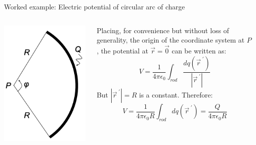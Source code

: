 {\begin{frame}{Worked example: Electric potential of circular arc of charge}
\begin{columns}
  \begin{column}{0.25\textwidth}
   \begin{center}
     \includegraphics[width=0.99\textwidth]{./images/problems/lect03_potential_arc}
   \end{center}
  \end{column}
  \begin{column}{0.70\textwidth}
    Placing, for convenience but without loss of generality, the origin of the
    coordinate system at $P$, the potential at $\vec{r}=\vec{0}$ can be written as:
    \begin{equation*}
       V = \frac{1}{4\pi\epsilon_0}
         \int_{rod} \frac{dq(\vec{r}^{\;\prime})}{|\vec{r}^{\;\prime}|}
    \end{equation*}
    But $|\vec{r}^{\;\prime}|=R$ is a constant. Therefore:
    \begin{equation*}
       V = \frac{1}{4\pi\epsilon_0 R}
         \int_{rod} dq(\vec{r}^{\;\prime}) =
         \frac{Q}{4\pi\epsilon_0 R}
    \end{equation*}
  \end{column}
\end{columns}

\end{frame}

} %

